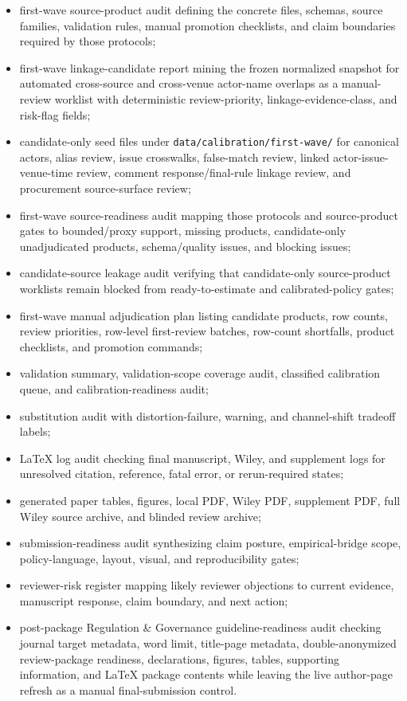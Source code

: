 \begin{itemize}
  \item first-wave source-product audit defining the concrete files, schemas, source families, validation rules, manual promotion checklists, and claim boundaries required by those protocols;
  \item first-wave linkage-candidate report mining the frozen normalized snapshot for automated cross-source and cross-venue actor-name overlaps as a manual-review worklist with deterministic review-priority, linkage-evidence-class, and risk-flag fields;
  \item candidate-only seed files under \texttt{data/calibration/first-wave/} for canonical actors, alias review, issue crosswalks, false-match review, linked actor-issue-venue-time review, comment response/final-rule linkage review, and procurement source-surface review;
  \item first-wave source-readiness audit mapping those protocols and source-product gates to bounded/proxy support, missing products, candidate-only unadjudicated products, schema/quality issues, and blocking issues;
  \item candidate-source leakage audit verifying that candidate-only source-product worklists remain blocked from ready-to-estimate and calibrated-policy gates;
  \item first-wave manual adjudication plan listing candidate products, row counts, review priorities, row-level first-review batches, row-count shortfalls, product checklists, and promotion commands;
  \item validation summary, validation-scope coverage audit, classified calibration queue, and calibration-readiness audit;
  \item substitution audit with distortion-failure, warning, and channel-shift tradeoff labels;
  \item LaTeX log audit checking final manuscript, Wiley, and supplement logs for unresolved citation, reference, fatal error, or rerun-required states;
  \item generated paper tables, figures, local PDF, Wiley PDF, supplement PDF, full Wiley source archive, and blinded review archive;
  \item submission-readiness audit synthesizing claim posture, empirical-bridge scope, policy-language, layout, visual, and reproducibility gates;
  \item reviewer-risk register mapping likely reviewer objections to current evidence, manuscript response, claim boundary, and next action;
  \item post-package Regulation \& Governance guideline-readiness audit checking journal target metadata, word limit, title-page metadata, double-anonymized review-package readiness, declarations, figures, tables, supporting information, and LaTeX package contents while leaving the live author-page refresh as a manual final-submission control.
\end{itemize}

